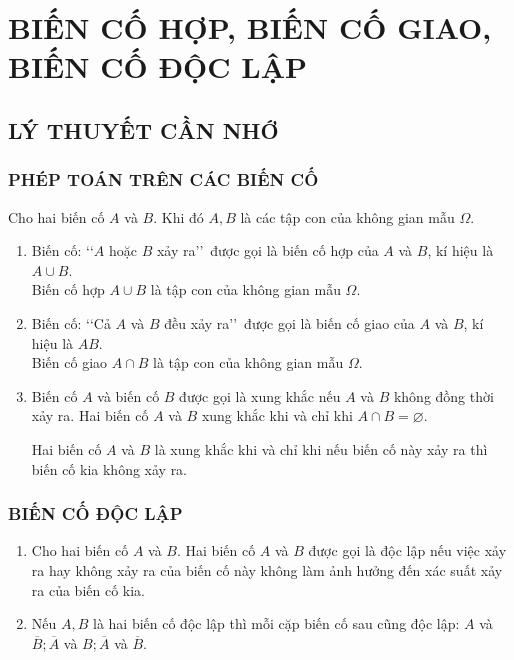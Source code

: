 \section{BIẾN CỐ HỢP, BIẾN CỐ GIAO, BIẾN CỐ ĐỘC LẬP}
\subsection{LÝ THUYẾT CẦN NHỚ}

\subsubsection{PHÉP TOÁN TRÊN CÁC BIẾN CỐ}
Cho hai biến cố $A$ và $B$. Khi đó $A, B$ là các tập con của không gian mẫu $\Omega$.
\begin{enumerate}[\iconMT]
	\item {} Biến cố: \lq\lq $A$ hoặc $B$ xảy ra\rq\rq\ được gọi là biến cố hợp của $A$ và $B$, kí hiệu là $A \cup B$.\\
	Biến cố hợp $A \cup B$ là tập con của không gian mẫu $\Omega$.
	\item {} Biến cố: \lq\lq Cả $A$ và $B$ đều xảy ra\rq\rq\ được gọi là biến cố giao của $A$ và $B$, kí hiệu là $A B$.\\
	Biến cố giao $A \cap B$ là tập con  của không gian mẫu $\Omega$.
	\item {} Biến cố $A$ và biến cố $B$ được gọi là xung khắc nếu $A$ và $B$ không đồng thời xảy ra.
	Hai biến cố $A$ và $B$ xung khắc khi và chỉ khi $A \cap B=\varnothing$.
	\begin{luuy}
		Hai biến cố $A$ và $B$ là xung khắc khi và chỉ khi nếu biến cố này xảy ra thì biến cố kia không xảy ra.
	\end{luuy}
\end{enumerate}
\subsubsection{BIẾN CỐ ĐỘC LẬP}
\begin{enumerate}[\iconMT]
	\item {} Cho hai biến cố $A$ và $B$. Hai biến cố $A$ và $B$ được gọi là độc lập nếu việc xảy ra hay không xảy ra của biến cố này không làm ảnh hưởng đến xác suất xảy ra của biến cố kia.
	\item {} Nếu $A, B$ là hai biến cố độc lập thì mỗi cặp biến cố sau cũng độc lập: $A$ và $\overline{B} ; \overline{A}$ và $B ; \overline{A}$ và $\overline{B}$.
\end{enumerate}

